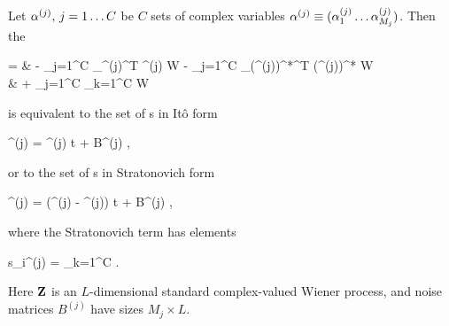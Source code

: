 \begin{theorem}
\label{thm:fpe-sde:corr:mc-fpe-sde}
	Let $\mathbf{\alpha}^{(j)},\, j = 1 \ldots C$ be $C$ sets of complex variables $\mathbf{\alpha}^{(j)} \equiv (\alpha_1^{(j)} \ldots \alpha_{M_j}^{(j)})$.
	Then the 
	\begin{eqn*}
		={} & - \sum_{j=1}^C \vcwd_{\balpha^{(j)}}^T \avec^{(j)} W
		- \sum_{j=1}^C \vcwd_{(\balpha^{(j)})^*}^T (\avec^{(j)})^* W \\
		& + \sum_{j=1}^C \sum_{k=1}^C
			 W
	\end{eqn*}
	is equivalent to the set of s in It\^{o} form
	\begin{eqn*}
		\upd\balpha^{(j)} = \avec^{(j)} \upd t + B^{(j)} \upd\Zvec,
	\end{eqn*}
	or to the set of s in Stratonovich form
	\begin{eqn*}
		\upd\balpha^{(j)} = (\avec^{(j)} - \svec^{(j)}) \upd t + B^{(j)} \upd\Zvec,
	\end{eqn*}
	where the Stratonovich term has elements
	\begin{eqn*}
		s_i^{(j)} =  \sum_{k=1}^C
			\Trace{ (B^{(k)})^H \vcwd_{(\balpha^{(k)})^*} \evec_i^T B^{(j)} }.
	\end{eqn*}
	Here $\mathbf{Z}$ is an $L$-dimensional standard complex-valued Wiener process, and noise matrices $B^{(j)}$ have sizes $M_j \times L$.
\end{theorem}
